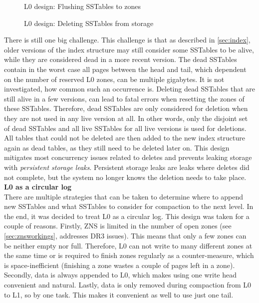 \begin{figure}[h]
\centering
\begin{minipage}{0.75\textwidth}
  \centering
  
\end{minipage}%
\caption{ L0 design: Flushing SSTables to zones }
\label{fig:l0append}
\end{figure}

\begin{figure}[h]
\centering
\begin{minipage}{0.75\textwidth}
  \centering
  
\end{minipage}%
\caption{ L0 design: Deleting SSTables from storage }
\label{fig:l0reset}
\end{figure}

There is still one big challenge. This challenge is that as described in \autoref{sec:index}, older versions of the index structure may still consider some SSTables to be alive, while they are considered dead in a more recent version. The dead SSTables contain in the worst case all pages between the head and tail, which dependent on the number of reserved L0 zones, can be multiple gigabytes. It is not investigated, how common such an occurrence is. Deleting dead SSTables that are still alive in a few versions, can lead to fatal errors when resetting the zones of these SSTables. Therefore, dead SSTables are only considered for deletion when they are not used in any live version at all. In other words, only the disjoint set of dead SSTables and all live SSTables for all live versions is used for deletions. All tables that could not be deleted are then added to the new index structure again as dead tables, as they still need to be deleted later on. This design mitigates most concurrency issues related to deletes and prevents leaking storage with \textit{persistent storage leaks}. Persistent storage leaks are leaks where deletes did not complete, but the system no longer knows the deletion needs to take place.\\
\textbf{L0 as a circular log}\\
There are multiple strategies that can be taken to determine where to append new SSTables and what SSTables to consider for compaction to the next level. In the end, it was decided to treat L0 as a circular log. This design was taken for a couple of reasons. Firstly, ZNS is limited in the number of open zones (see \autoref{sec:znsworkings}, addresses DR3 issues). This means that only a few zones can be neither empty nor full. Therefore, L0 can not write to many different zones at the same time or is required to finish zones regularly as a counter-measure, which is space-inefficient (finishing a zone wastes a couple of pages left in a zone). Secondly, data is always appended to L0, which makes using one write head convenient and natural. Lastly, data is only removed during compaction from L0 to L1, so by one task. This makes it convenient as well to use just one tail. 

